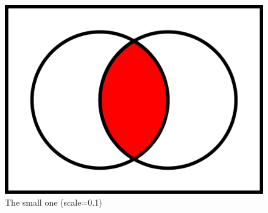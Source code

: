 \documentclass[12pt]{article}
\theoremstyle{plain}
\theoremstyle{definition}
\theoremstyle{remark}
\theoremstyle{mystyle}
\begin{document}
\begin{figure}[ht]
\centering
\includegraphics[scale=0.1]{AcapB}
\caption{The small one (scale=0.1)\label{fig:acapb-small}}
\end{figure}
\end{document}
